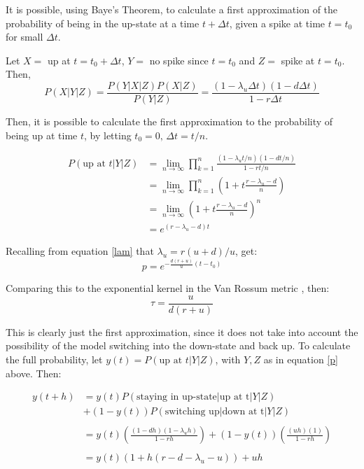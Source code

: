 It is possible, using Baye's Theorem, to calculate a first approximation of the probability of being in the up-state at a time $t+\Delta t$, given a spike at time $t=t_0$ for small $\Delta t$.

 Let $X=$ up at $t=t_0+\Delta t$, $Y=$ no spike since $t=t_0$ and $Z=$ spike at $t=t_0$. Then,
\begin{equation}\label{p}
P(X|Y|Z) = \frac{P(Y|X|Z)P(X|Z)}{P(Y|Z)} = \frac{(1-\lambda_u \Delta t) (1-d \Delta t)}{1-r\Delta t}
\end{equation}

Then, it is possible to calculate the first approximation to the probability  of being up at time $t$, by letting $t_0=0, \,\Delta t =t/n$.

\begin{equation}
\begin{split}
P(\mbox{up at } t | Y | Z)   &=  \lim_{n \rightarrow \infty}\prod_{k=1}^n \frac{(1-\lambda_ut/n)(1-dt/n)}{1-rt/n}  \\
&= \lim_{n \rightarrow \infty} \prod_{k=1}^n \left(1+ t\frac{r-\lambda_u-d}{n}\right) \\
& = \lim_{n \rightarrow \infty} \left(1 + t\frac{r-\lambda_u -d}{n} \right)^n \\
&=  e^{(r-\lambda_u-d)t}
\end{split}
\end{equation}

Recalling from equation \ref{lam} that $\lambda_u = r(u+d)/u$, get:
\begin{equation}
p=e^{-\frac{d(r+u)}{u}(t-t_0)}
\end{equation}


Comparing this to the exponential kernel in the Van Rossum metric \cite{vanRossum2001}, then:
\begin{equation}
\tau = \frac{u}{d(r+u)}
\end{equation}

This is clearly just the first approximation, since it does not take into account the possibility of the model switching into the down-state and back up.  To calculate the full probability, let $y(t) = P(\mbox{up at } t | Y | Z)$, with $Y,Z$ as in equation \ref{p} above.  Then:

\begin{equation}
\begin{split}
y(t+h) &=  y(t)P(\mbox{staying in up-state} | \mbox{up at t}|Y|Z)  \\
& + (1-y(t))P(\mbox{switching up} | \mbox{down at t}|Y|Z)\\
&\\
&= y(t)\left( \frac{(1-dh)(1-\lambda_uh)}{1-rh} \right) + (1-y(t)) \left(\frac{(uh)(1)}{1-rh}  \right)\\
&\\
& = y(t)\left( 1 + h(r-d-\lambda_u-u ) \right) + uh
\end{split}
\end{equation}

